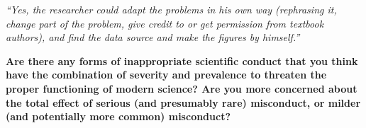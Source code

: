 \documentclass[portrait,11pt]{seminar}
\begin{document}
\medskip

{\it ``Yes, the researcher could adapt the problems in his own way (rephrasing it, change part of the problem, give credit to or get permission from textbook authors), and find the data source and make the figures by himself.''}

\es

\bs



\es

\bs

\es


\bs

{\bf Are there any forms of inappropriate scientific conduct that you think have the combination of severity and prevalence to threaten the proper functioning of modern science? Are you more concerned about the total effect of serious (and presumably rare) misconduct, or milder (and potentially more common) misconduct?}

\end{document}
